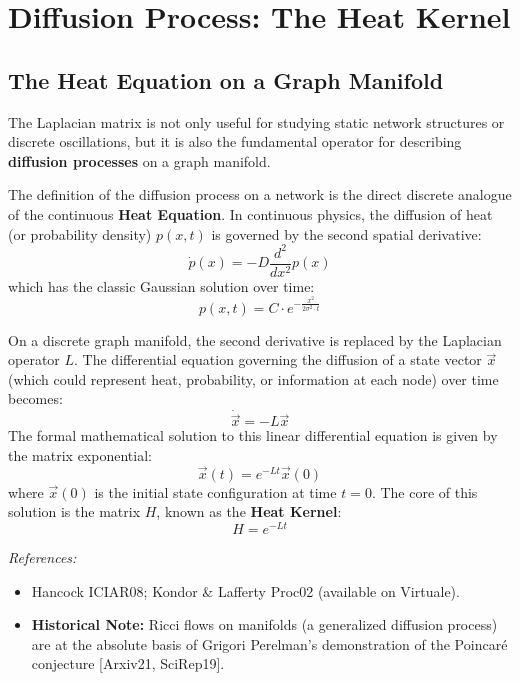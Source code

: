 \section{Diffusion Process: The Heat Kernel}

\subsection{The Heat Equation on a Graph Manifold}
The Laplacian matrix is not only useful for studying static network structures or discrete oscillations, but it is also the fundamental operator for describing \textbf{diffusion processes} on a graph manifold.

The definition of the diffusion process on a network is the direct discrete analogue of the continuous \textbf{Heat Equation}. In continuous physics, the diffusion of heat (or probability density) $p(x,t)$ is governed by the second spatial derivative:
\[
    \dot{p}(x) = -D \frac{d^2}{dx^2}p(x)
\]
which has the classic Gaussian solution over time:
\[
    p(x,t) = C \cdot e^{-\frac{x^2}{2\sigma^2 \cdot t}}
\]

On a discrete graph manifold, the second derivative is replaced by the Laplacian operator \( L \). The differential equation governing the diffusion of a state vector \( \vec{x} \) (which could represent heat, probability, or information at each node) over time becomes:
\[
    \dot{\vec{x}} = -L\vec{x}
\]
The formal mathematical solution to this linear differential equation is given by the matrix exponential:
\[
    \vec{x}(t) = e^{-Lt} \vec{x}(0)
\]
where \( \vec{x}(0) \) is the initial state configuration at time \( t=0 \).
The core of this solution is the matrix \( H \), known as the \textbf{Heat Kernel}:
\[
    H = e^{-Lt}
\]

\textit{References:}
\begin{itemize}
    \item Hancock ICIAR08; Kondor \& Lafferty Proc02 (available on Virtuale).
    \item \textbf{Historical Note:} Ricci flows on manifolds (a generalized diffusion process) are at the absolute basis of Grigori Perelman's demonstration of the Poincaré conjecture [Arxiv21, SciRep19].
\end{itemize}


